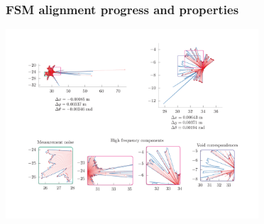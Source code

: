 \begin{frame}[noframenumbering]

  \frametitle{FSM alignment progress and properties}


  \begin{center}
    \includegraphics[height=200pt,width=267pt]{./figures/translation_and_rotation/all_fig14.png}
  \end{center}

\end{frame}
